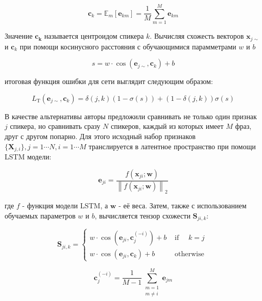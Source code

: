 \documentclass[oneside,final,14pt]{extreport}
\begin{document}
$$
\begin{equation}
\mathbf{c}_{k}=\mathbb{E}_{m}\left[\mathbf{e}_{k m}\right]=\frac{1}{M} \sum_{m=1}^{M} \mathbf{e}_{k m}
\end{equation}
$$

Значение $\mathbf{c_k}$ называется центроидом спикера $k$. Вычисляя схожесть векторов $\mathbf{x}_{j \sim}$ и $\mathbf{c}_{k}$ при помощи косинусного расстояния с обучающимися парамметрами $w$ и $b$ 

$$
\begin{equation}
s=w \cdot \cos \left(\mathbf{e}_{j \sim}, \mathbf{c}_{k}\right)+b
\end{equation}
$$

итоговая функция ошибки для сети выглядит следующим образом:

$$
\begin{equation}
L_{\mathrm{T}}\left(\mathbf{e}_{j \sim}, \mathbf{c}_{k}\right)=\delta(j, k)(1-\sigma(s))+(1-\delta(j, k)) \sigma(s)
\end{equation}
$$

В качестве альтернативы авторы \cite{bib:e2e_speaker_ver_loss} предложили сравнивать не только один признак $j$ спикера, но сравнивать сразу $N$ спикеров, каждый из которых имеет $M$ фраз, друг с другом попарно. Для этого исходный набор признаков $\{\mathbf{X}_{j , i}\}, j = 1\cdots N, i=1\cdots M$ транслируется в латентное пространство при помощи LSTM модели: 

$$
\begin{equation}
\mathbf{e}_{j i}=\frac{f\left(\mathbf{x}_{j i} ; \mathbf{w}\right)}{\left\|f\left(\mathbf{x}_{j i} ; \mathbf{w}\right)\right\|_{2}}
\end{equation}
$$

где $f$ - функция модели LSTM, а $\mathbf{w}$ - её веса. Затем, также с использованием обучаемых параметров $w$  и $b$, вычисляется тензор схожести $\mathbf{S}_{j i, k}$:



\begin{equation}
\mathbf{S}_{j i, k}= \begin{cases}w \cdot \cos \left(\mathbf{e}_{j i}, \mathbf{c}_{j}^{(-i)}\right)+b & \text { if } \quad k=j \\ w \cdot \cos \left(\mathbf{e}_{j i}, \mathbf{c}_{k}\right)+b & \text { otherwise }\end{cases}
\end{equation}

\begin{equation}
\mathbf{c}_{j}^{(-i)}=\frac{1}{M-1} \sum_{\substack{m=1 \\ m \neq i}}^{M} \mathbf{e}_{j m}
\end{equation}
\end{document}
